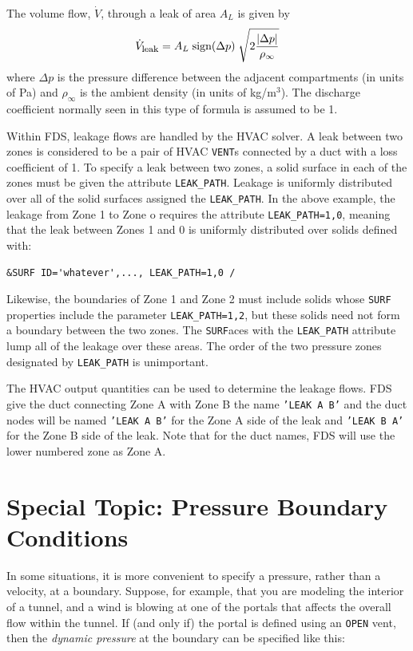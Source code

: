 \documentclass[11pt]{book}
\newcommand{\ct}{\tt\small}
\newcommand{\be}{\begin{equation}}
\newcommand{\ee}{\end{equation}}
\begin{document}
The volume flow, $\dot{V}$, through a leak of area $A_L$ is given by
\be  \dot{V}_{\hbox{\footnotesize leak}} = A_L \; \hbox{sign} (\Delta p) \; \sqrt{2 \frac{ | \Delta p |}{\rho_\infty}} \ee
where $\Delta p$ is the pressure difference between the adjacent compartments (in units of Pa) and
$\rho_\infty$ is the ambient density (in units of kg/m$^3$). The discharge coefficient normally seen in this type of formula is assumed
to be 1.

Within FDS, leakage flows are handled by the HVAC solver.  A leak between two zones is considered to be a pair of HVAC {\ct VENT}s connected by a duct with a loss coefficient of 1.  To specify a leak between two zones, a solid surface in each of the zones must be given the attribute {\ct LEAK\_PATH}.  Leakage is uniformly distributed over all of the solid surfaces assigned the {\ct LEAK\_PATH}.  In the above example, the leakage from Zone 1 to Zone o requires the attribute
{\ct LEAK\_PATH=1,0}, meaning that the leak between Zones 1 and 0 is uniformly distributed
over solids defined with:

\footnotesize
\begin{verbatim}
&SURF ID='whatever',..., LEAK_PATH=1,0 /
\end{verbatim}
\normalsize

\noindent
Likewise, the boundaries of Zone 1 and Zone 2 must include solids whose {\ct SURF} properties include the parameter {\ct LEAK\_PATH=1,2}, but these solids need not form a boundary between the
two zones. The {\ct SURF}aces with the {\ct LEAK\_PATH} attribute lump all of the
leakage over these areas. The order of the two pressure zones designated by {\ct LEAK\_PATH} is unimportant.

The HVAC output quantities can be used to determine the leakage flows.  FDS give the duct connecting Zone A with Zone B the name {\ct 'LEAK A B'} and the duct nodes will be named {\ct 'LEAK A B'} for the Zone A side of the leak and {\ct 'LEAK B A'} for the Zone B side of the leak.  Note that for the duct names, FDS will use the lower numbered zone as Zone A.

\clearpage

\section{Special Topic: Pressure Boundary Conditions}
\label{info:pressure_boundary}

In some situations, it is more convenient to specify a pressure, rather than a velocity, at a boundary. Suppose, for example, that you are modeling the
interior of a tunnel, and a wind is blowing at one of the portals that affects the overall flow within the tunnel. If (and only if) the portal is defined using an
{\ct OPEN} vent, then the {\em dynamic pressure} at the boundary can be specified like this:
\end{document}
